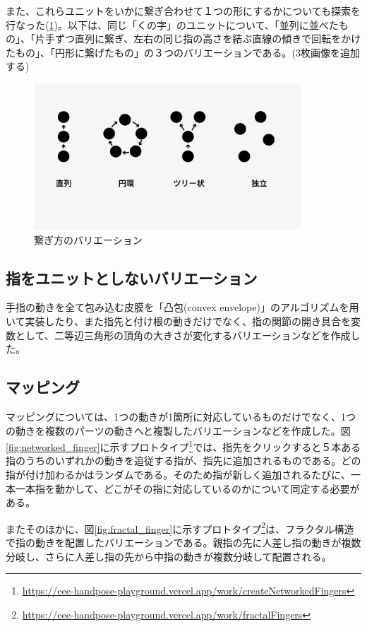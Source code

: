 また、これらユニットをいかに繋ぎ合わせて１つの形にするかについても探索を行なった(\ref{fig:connection_valiation})。以下は、同じ「くの字」のユニットについて、「並列に並べたもの」、「片手ずつ直列に繋ぎ、左右の同じ指の高さを結ぶ直線の傾きで回転をかけたもの」、「円形に繋げたもの」の３つのバリエーションである。(3枚画像を追加する)

\begin{figure}[H]
  \centering
  \includegraphics[width=10cm]{img/network.png}
  \caption{繋ぎ方のバリエーション}
  \label{fig:connection_valiation}
\end{figure}



\subsection*{指をユニットとしないバリエーション}
手指の動きを全て包み込む皮膜を「凸包(convex envelope)」のアルゴリズムを用いて実装したり、また指先と付け根の動きだけでなく、指の関節の開き具合を変数として、二等辺三角形の頂角の大きさが変化するバリエーションなどを作成した。

\subsection{マッピング}
マッピングについては、1つの動きが1箇所に対応しているものだけでなく、1つの動きを複数のパーツの動きへと複製したバリエーションなどを作成した。図\ref{fig:networked_finger}に示すプロトタイプ\footnote{\url{https://eee-handpose-playground.vercel.app/work/createNetworkedFingers}}では、指先をクリックすると５本ある指のうちのいずれかの動きを追従する指が、指先に追加されるものである。どの指が付け加わるかはランダムである。そのため指が新しく追加されるたびに、一本一本指を動かして、どこがその指に対応しているのかについて同定する必要がある。

またそのほかに、図\ref{fig:fractal_finger}に示すプロトタイプ\footnote{\url{https://eee-handpose-playground.vercel.app/work/fractalFingers}}は、フラクタル構造で指の動きを配置したバリエーションである。親指の先に人差し指の動きが複数分岐し、さらに人差し指の先から中指の動きが複数分岐して配置される。

